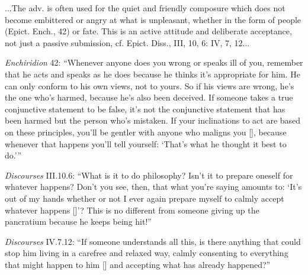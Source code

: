 \begin{compactdesc}
					\item[TDNT] ...The adv.  is often used for the quiet and friendly composure which does not become embittered or angry at what is unpleasant, whether in the form of people (Epict. Ench., 42) or fate. This is an active attitude and deliberate acceptance, not just a passive submission, cf. Epict. Diss., III, 10, 6:  IV, 7, 12...
						\begin{compactitem}
							\item \textit{Enchiridion} 42: ``Whenever anyone does you wrong or speaks ill of you, remember that he acts and speaks as he does because he thinks it's appropriate for him. He can only conform to his own views, not to yours. So if his views are wrong, he's the one who's harmed, because he's also been deceived. If someone takes a true conjunctive statement to be false, it's not the conjunctive statement that has been harmed but the person who's mistaken. If your inclinations to act are based on these principles, you'll be gentler with anyone who maligns you [], because whenever that happens you'll tell yourself: `That's what he thought it best to do.'''
							\item \textit{Discourses} III.10.6: ``What is it to do philosophy? Isn't it to prepare oneself for whatever happens? Don't you see, then, that what you're saying amounts to: `It's out of my hands whether or not I ever again prepare myself to calmly accept whatever happens []'? This is no different from someone giving up the pancratium because he keeps being hit!''
							\item \textit{Discourses} IV.7.12: ``If someone understands all this, is there anything that could stop him living in a carefree and relaxed way, calmly consenting to everything that might happen to him [] and accepting what has already happened?''
						\end{compactitem}

				\end{compactdesc}
				
				
				
